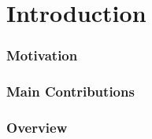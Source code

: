 \section{Introduction}
\label{sec:intro}


\subsubsection*{Motivation}

\subsubsection*{Main Contributions}


\subsubsection*{Overview}



